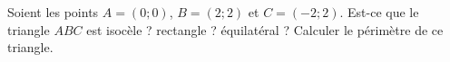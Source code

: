 
\begin{exercice}\label{exoSeconde-0006}

    Soient les points \( A=(0;0)\), \( B=(2;2)\) et \( C=(-2;2)\). Est-ce que le triangle \( ABC\) est isocèle ? rectangle ? équilatéral ? Calculer le périmètre de ce triangle.

\end{exercice}

